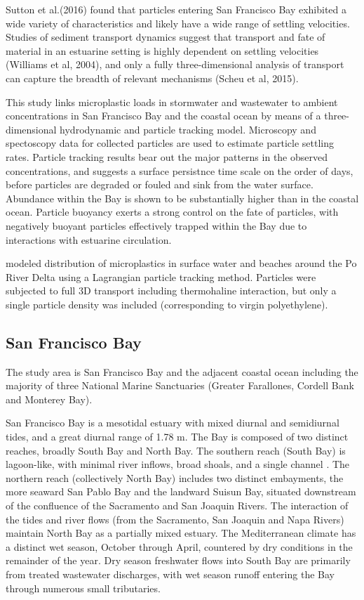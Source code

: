 \documentclass[draft]{jgr/agujournal2019}
\begin{document}
  Sutton et al.(2016) found that particles entering San Francisco Bay
  exhibited a wide variety of characteristics and likely have a wide
  range of settling velocities.  Studies of sediment transport
  dynamics suggest that transport and fate of material in an estuarine
  setting is highly dependent on settling velocities (Williams et al,
  2004), and only a fully three-dimensional analysis of transport can
  capture the breadth of relevant mechanisms (Scheu et al, 2015).
  
  This study links microplastic loads in stormwater and wastewater to
  ambient concentrations in San Francisco Bay and the coastal ocean by
  means of a three-dimensional hydrodynamic and particle tracking
  model.  Microscopy and spectoscopy data for collected particles are
  used to estimate particle settling rates. Particle tracking results
  bear out the major patterns in the observed concentrations, and
  suggests a surface persistnce time scale on the order of days,
  before particles are degraded or fouled and sink from the water
  surface. Abundance within the Bay is shown to be substantially
  higher than in the coastal ocean.  Particle buoyancy exerts a strong
  control on the fate of particles, with negatively buoyant particles
  effectively trapped within the Bay due to interactions with
  estuarine circulation.

  \cite{Atwood2019} modeled distribution of microplastics in surface water
  and beaches around the Po River Delta using a Lagrangian particle tracking
  method. Particles were subjected to full 3D transport including thermohaline
  interaction, but only a single particle density was included (corresponding
  to virgin polyethylene).


  
\subsection{San Francisco Bay}

The study area is San Francisco Bay and the adjacent coastal ocean
including the majority of three National Marine Sanctuaries (Greater
Farallones, Cordell Bank and Monterey Bay).

San Francisco Bay is a mesotidal estuary with mixed diurnal and
semidiurnal tides, and a great diurnal range of 1.78 m. The Bay is
composed of two distinct reaches, broadly South Bay and North Bay. The
southern reach (South Bay) is lagoon-like, with minimal river inflows,
broad shoals, and a single channel \cite{Conomos1985}.  The northern
reach (collectively North Bay) includes two distinct embayments, the
more seaward San Pablo Bay and the landward Suisun Bay, situated
downstream of the confluence of the Sacramento and San Joaquin
Rivers. The interaction of the tides and river flows (from the
Sacramento, San Joaquin and Napa Rivers) maintain North
Bay as a partially mixed estuary. The Mediterranean climate has a
distinct wet season, October through April, countered by dry
conditions in the remainder of the year.
Dry season freshwater flows into South Bay are primarily from treated wastewater
discharges, with wet season runoff entering the Bay through
numerous small tributaries.
\end{document}
